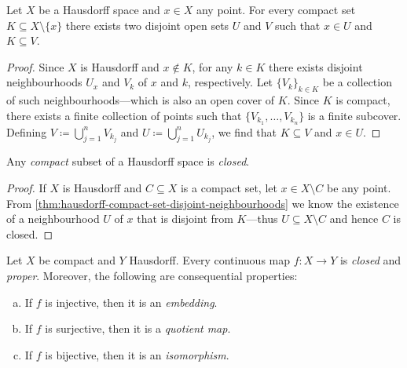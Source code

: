 \begin{theorem}
\label{thm:hausdorff-compact-set-disjoint-neighbourhoods}
Let \(X\) be a Hausdorff space and \(x \in X\) any point. For every compact set
\(K \subseteq X \setminus \{x\}\) there exists two disjoint open sets \(U\) and
\(V\) such that \(x \in U\) and \(K \subseteq V\).
\end{theorem}

\begin{proof}
Since \(X\) is Hausdorff and \(x \notin K\), for any \(k \in K\) there exists
disjoint neighbourhoods \(U_x\) and \(V_k\) of \(x\) and \(k\),
respectively. Let \(\{V_{k}\}_{k \in K}\) be a collection of such neighbourhoods---which is also an open cover of \(K\). Since \(K\) is compact, there exists a
finite collection of points such that \(\{V_{k_1}, \dots, V_{k_n}\}\) is a
finite subcover. Defining \(V \coloneq \bigcup_{j=1}^n V_{k_j}\) and
\(U \coloneq \bigcup_{j=1}^n U_{k_j}\), we find that \(K \subseteq V\) and
\(x \in U\).
\end{proof}

\begin{corollary}
\label{cor:hausdorff-compact-subset-is-closed}
Any \emph{compact} subset of a Hausdorff space is \emph{closed}.
\end{corollary}

\begin{proof}
If \(X\) is Hausdorff and \(C \subseteq X\) is a compact set, let
\(x \in X \setminus C\) be any point. From
\cref{thm:hausdorff-compact-set-disjoint-neighbourhoods} we know the existence
of a neighbourhood \(U\) of \(x\) that is disjoint from \(K\)---thus
\(U \subseteq X \setminus C\) and hence \(C\) is closed.
\end{proof}

\begin{corollary}
\label{cor:map-compact-to-hausdorff-is-closed}
Let \(X\) be compact and \(Y\) Hausdorff. Every continuous map \(f: X \to Y\) is
\emph{closed} and \emph{proper}. Moreover, the following are consequential
properties:
\begin{enumerate}[(a)]\setlength\itemsep{0em}
\item If \(f\) is injective, then it is an \emph{embedding}.
\item If \(f\) is surjective, then it is a \emph{quotient map}.
\item If \(f\) is bijective, then it is an \emph{isomorphism}.
\end{enumerate}
\end{corollary}

